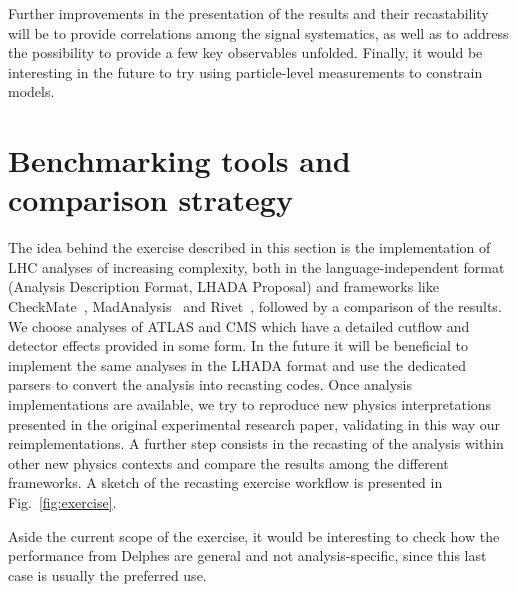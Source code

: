 \documentclass[11pt]{cernrep}
\begin{document}
Further improvements in the presentation of the results and their recastability
will be to provide correlations among the signal systematics, as well as to
address the possibility to provide a few key observables unfolded. Finally, it would be interesting in the future to try using particle-level measurements to constrain models.


\section{Benchmarking tools and comparison strategy}

The idea behind the exercise described in this section is the implementation of
LHC analyses of increasing complexity, both in the language-independent format
(Analysis Description Format, LHADA Proposal) and frameworks like
CheckMate~\cite{checkmate},
MadAnalysis~\cite{Conte:2012fm,Conte:2014zja,Dumont:2014tja}
and Rivet~\cite{rivet}, followed by a comparison of the results.
We choose analyses of ATLAS and CMS which have a detailed cutflow and detector effects provided in some form.
In the future it will be beneficial to implement the same analyses in the LHADA format and use the dedicated parsers to convert the analysis into recasting codes.
Once analysis implementations are available, we try to reproduce new physics
interpretations presented in the original experimental research paper,
validating in this way our reimplementations.
A further step consists in the recasting of the analysis within other new
physics contexts and compare the results among the different frameworks.
A sketch of the recasting exercise workflow is presented in Fig.~\ref{fig:exercise}.

Aside the current scope of the exercise, it would be interesting to check how the performance from Delphes are general and not analysis-specific, since this
last case is usually the preferred use.
\end{document}
